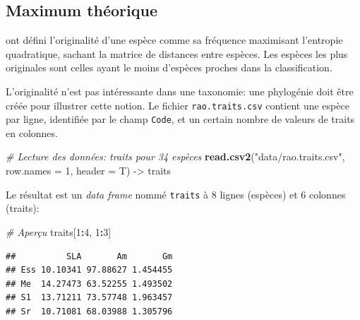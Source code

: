 \documentclass[
  11pt,
  french,
  a4paper,
  extrafontsizes,onecolumn,openright
  ]{memoir}
\newenvironment{Shaded}{\begin{snugshade}}{\end{snugshade}}
\newcommand{\AttributeTok}[1]{\textcolor[rgb]{0.13,0.29,0.53}{#1}}
\newcommand{\CommentTok}[1]{\textcolor[rgb]{0.56,0.35,0.01}{\textit{#1}}}
\newcommand{\DecValTok}[1]{\textcolor[rgb]{0.00,0.00,0.81}{#1}}
\newcommand{\FunctionTok}[1]{\textcolor[rgb]{0.13,0.29,0.53}{\textbf{#1}}}
\newcommand{\NormalTok}[1]{#1}
\newcommand{\OtherTok}[1]{\textcolor[rgb]{0.56,0.35,0.01}{#1}}
\newcommand{\SpecialCharTok}[1]{\textcolor[rgb]{0.81,0.36,0.00}{\textbf{#1}}}
\newcommand{\StringTok}[1]{\textcolor[rgb]{0.31,0.60,0.02}{#1}}
\begin{document}
\normalsize

\subsection{Maximum théorique}\label{sec-MaxTheorique}

\textcite{Pavoine2005a} ont défini l'originalité d'une espèce comme sa fréquence maximisant l'entropie quadratique, sachant la matrice de distances entre espèces.
Les espèces les plus originales sont celles ayant le moins d'espèces proches dans la classification.

L'originalité n'est pas intéressante dans une taxonomie: une phylogénie doit être créée pour illustrer cette notion.
Le fichier \texttt{rao.traits.csv} contient une espèce par ligne, identifiée par le champ \texttt{Code}, et un certain nombre de valeurs de traits en colonnes.

\scriptsize

\begin{Shaded}
\begin{Highlighting}[]
\CommentTok{\# Lecture des données: traits pour 34 espèces}
\FunctionTok{read.csv2}\NormalTok{(}\StringTok{"data/rao.traits.csv"}\NormalTok{, }\AttributeTok{row.names =} \DecValTok{1}\NormalTok{, }\AttributeTok{header =}\NormalTok{ T) }\OtherTok{{-}\textgreater{}}
\NormalTok{    traits}
\end{Highlighting}
\end{Shaded}

\normalsize

Le résultat est un \emph{data frame} nommé \texttt{traits} à 8 lignes (espèces) et 6 colonnes (traits):

\scriptsize

\begin{Shaded}
\begin{Highlighting}[]
\CommentTok{\# Aperçu}
\NormalTok{traits[}\DecValTok{1}\SpecialCharTok{:}\DecValTok{4}\NormalTok{, }\DecValTok{1}\SpecialCharTok{:}\DecValTok{3}\NormalTok{]}
\end{Highlighting}
\end{Shaded}

\begin{verbatim}
##          SLA       Am       Gm
## Ess 10.10341 97.88627 1.454455
## Me  14.27473 63.52255 1.493502
## S1  13.71211 73.57748 1.963457
## Sr  10.71081 68.03988 1.305796
\end{verbatim}

\normalsize
\end{document}

